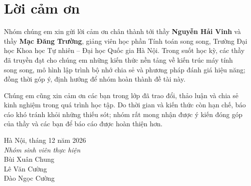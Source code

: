 \chapter*{Lời cảm ơn}

Nhóm chúng em xin gửi lời cảm ơn chân thành tới thầy \textbf{Nguyễn Hải Vinh} và thầy
\textbf{Mạc Đăng Trường}, giảng viên học phần Tính toán song song, Trường Đại học Khoa học
Tự nhiên -- Đại học Quốc gia Hà Nội. Trong suốt học kỳ, các thầy đã truyền đạt cho chúng em
những kiến thức nền tảng về kiến trúc máy tính song song, mô hình lập trình bộ nhớ chia sẻ
và phương pháp đánh giá hiệu năng; đồng thời góp ý, định hướng để nhóm hoàn thành đề tài này.

Chúng em cũng xin cảm ơn các bạn trong lớp đã trao đổi, thảo luận và chia sẻ kinh nghiệm
trong quá trình học tập. Do thời gian và kiến thức còn hạn chế, báo cáo khó tránh khỏi
những thiếu sót; nhóm rất mong nhận được ý kiến đóng góp của thầy và các bạn để báo cáo
được hoàn thiện hơn.

\vspace{1cm}
\begin{flushright}
\begin{minipage}{6cm}
\centering
Hà Nội, tháng 12 năm 2026\\
\textit{Nhóm sinh viên thực hiện}\\[0.3cm]
Bùi Xuân Chung\\
Lê Văn Cường\\
Đào Ngọc Cường
\end{minipage}
\end{flushright}
